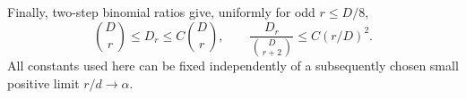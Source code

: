 Finally, two-step binomial ratios give, uniformly for odd $r\le D/8$,
\begin{equation}\label{eq:dimensionratios}
 \binom Dr\le D_r\le C\binom Dr,
 \qquad \frac{D_r}{\binom D{r+2}}\le C(r/D)^2.
\end{equation}
All constants used here can be fixed independently of a subsequently
chosen small positive limit $r/d\to\alpha$.
